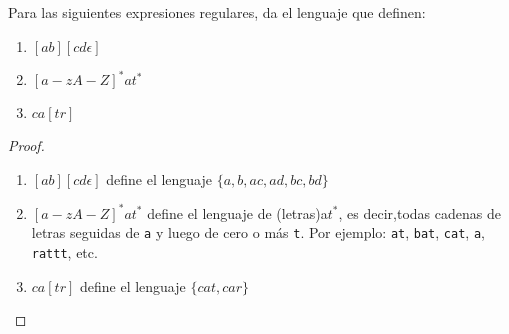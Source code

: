 \begin{Pro}
    Para las siguientes expresiones regulares, da el lenguaje que definen: 
    \begin{enumerate}
        \item $[ab][cd\epsilon]$ 
        \item $[a-zA-Z]^*at^*$
        \item $ca[tr]$
    \end{enumerate}
\end{Pro}
\begin{proof}
    \hspace{1cm}
    \begin{enumerate}
        \item $[ab][cd\epsilon]$ define el lenguaje $\{a,b,ac,ad,bc, bd\}$
        \item $[a-zA-Z]^*at^*$ define el lenguaje de (letras)a$t^*$, es decir,todas cadenas de letras seguidas de \texttt{a} y luego de cero o más \texttt{t}. Por ejemplo: \texttt{at}, \texttt{bat}, \texttt{cat}, \texttt{a}, \texttt{rattt}, etc.
        \item $ca[tr]$ define el lenguaje $\{cat, car\}$
    \end{enumerate}
\end{proof}